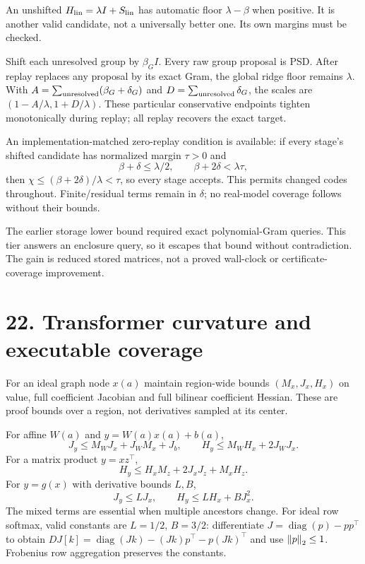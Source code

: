 An unshifted $H_{\rm lin}=\lambda I+S_{\rm lin}$ has automatic floor $\lambda-\beta$ when positive. It is another valid candidate, not a universally better one. Its own margins must be checked.

 Shift each unresolved group by $\beta_G I$. Every raw group proposal is PSD. After replay replaces any proposal by its exact Gram, the global ridge floor remains $\lambda$. With $A=\sum_{\rm unresolved}(\beta_G+\delta_G)$ and $D=\sum_{\rm unresolved}\delta_G$, the scales are $(1-A/\lambda,1+D/\lambda)$. These particular conservative endpoints tighten monotonically during replay; all replay recovers the exact target.

An implementation-matched zero-replay condition is available: if every stage's shifted candidate has normalized margin $\tau>0$ and
\[
 \beta+\delta\leq\lambda/2,\qquad \beta+2\delta<\lambda\tau,
\]
then $\chi\leq(\beta+2\delta)/\lambda<\tau$, so every stage accepts. This permits changed codes throughout. Finite/residual terms remain in $\delta$; no real-model coverage follows without their bounds.

The earlier storage lower bound required exact polynomial-Gram queries. This tier answers an enclosure query, so it escapes that bound without contradiction. The gain is reduced stored matrices, not a proved wall-clock or certificate-coverage improvement.

\newpage
\section*{22. Transformer curvature and executable coverage}
For an ideal graph node $x(a)$ maintain region-wide bounds $(M_x,J_x,H_x)$ on value, full coefficient Jacobian and full bilinear coefficient Hessian. These are proof bounds over a region, not derivatives sampled at its center.

For affine $W(a)$ and $y=W(a)x(a)+b(a)$,
\[
 J_y\leq M_WJ_x+J_WM_x+J_b,\qquad
 H_y\leq M_WH_x+2J_WJ_x.
\]
For a matrix product $y=xz^\top$,
\[
 H_y\leq H_xM_z+2J_xJ_z+M_xH_z.
\]
For $y=g(x)$ with derivative bounds $L,B$,
\[
 J_y\leq LJ_x,\qquad H_y\leq LH_x+BJ_x^2.
\]
The mixed terms are essential when multiple ancestors change. For ideal row softmax, valid constants are $L=1/2$, $B=3/2$: differentiate $J=\operatorname{diag}(p)-pp^\top$ to obtain $DJ[k]=\operatorname{diag}(Jk)-(Jk)p^\top-p(Jk)^\top$ and use $\left\|p\right\|_2\leq1$. Frobenius row aggregation preserves the constants.

